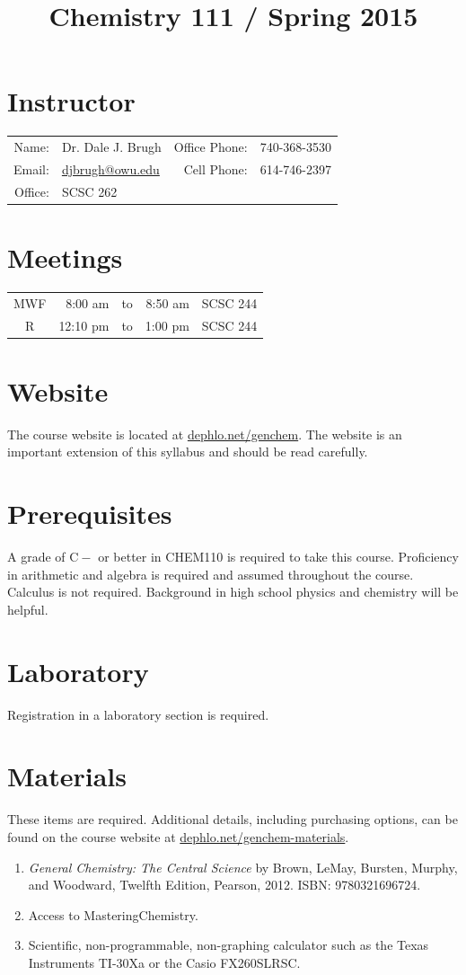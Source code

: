 \documentclass[letterpaper,oneside,onecolumn,11pt,article]{memoir}
\title{Chemistry 111 / Spring 2015}
\date{}
\author{}
\begin{document}
\maketitle
\thispagestyle{courseinformationtitle}
%
%
\section{Instructor}
\begin{tabular}{rl|rl}
Name: & Dr. Dale J. Brugh & Office Phone: & 740-368-3530 \\
Email: & \href{mailto:djbrugh@owu.edu}{djbrugh@owu.edu} & Cell Phone: & 614-746-2397 \\
Office: & SCSC 262 & &  \\
\end{tabular}
%
%
\section{Meetings}
\begin{tabular}{crcrl}
MWF & 8:00 am & to & 8:50 am & SCSC 244 \\
R & 12:10 pm & to & 1:00 pm & SCSC 244
\end{tabular}
%
%
\section{Website}
The course website is located at \href{http://dephlo.net/genchem}{dephlo.net/genchem}. The website is an important extension of this syllabus and should be read carefully. 
%
%
\section{Prerequisites}
A grade of $\mathrm{C}-$ or better in CHEM110 is required to take this course. Proficiency in arithmetic and algebra is required and assumed throughout the course. Calculus is not required. Background in high school physics and chemistry will be helpful. 
%
%
\section{Laboratory}
Registration in a laboratory section is required. 
%
%
\section{Materials}
These items are required. Additional details, including purchasing options, can be found on the course website at \href{http://dephlo.net/genchem-materials}{dephlo.net/genchem-materials}.
\begin{enumerate}[1.]
\item \textit{General Chemistry: The Central Science} by Brown, LeMay, Bursten, Murphy, and Woodward, Twelfth Edition, Pearson, 2012. ISBN: 9780321696724. 
\item Access to MasteringChemistry. 
\item Scientific, non-programmable, non-graphing calculator such as the Texas Instruments TI-30Xa or the  Casio FX260SLRSC.
\end{enumerate}
%
%
\end{document}
